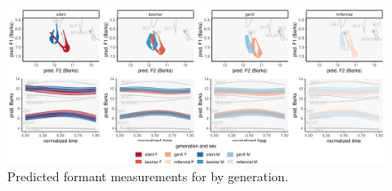 \begin{figure}[p]
	\centering
	\includegraphics[angle = 90, origin = c, height = \textwidth]{Figures/BAT/BAT_sex_panel_plot_wide.pdf}
	\caption[Predicted formant measurements for \bat by generation.]{Predicted formant measurements for \bat by generation.}
	\label{fig:BAT_sex_panel_plot_wide}
\end{figure}

